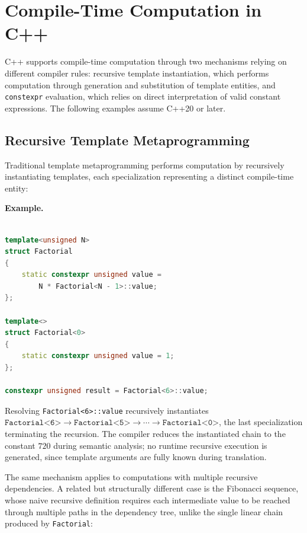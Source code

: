 \documentclass[11pt]{report}
\begin{document}

\section{Compile-Time Computation in C++}
\label{Metaprogramming:Compile-TimeComputationCpp}

C++ supports compile-time computation through two mechanisms relying on
different compiler rules: recursive template instantiation, which performs
computation through generation and substitution of template entities, and
\texttt{constexpr} evaluation, which relies on direct interpretation of
valid constant expressions. The following examples assume C++20 or later.

\subsection{Recursive Template Metaprogramming}
\label{Metaprogramming:Compile-TimeComputationCpp:RecursiveTemplateMetaprogrammingExample}
Traditional template metaprogramming performs computation by recursively
instantiating templates, each specialization representing a distinct
compile-time entity:

\begin{examplebox}
\textbf{Example.}

\begin{lstlisting}[language=C++]

template<unsigned N>
struct Factorial
{
    static constexpr unsigned value =
        N * Factorial<N - 1>::value;
};

template<>
struct Factorial<0>
{
    static constexpr unsigned value = 1;
};

constexpr unsigned result = Factorial<6>::value;
\end{lstlisting}
Resolving \texttt{Factorial<6>::value} recursively instantiates
$\texttt{Factorial<6>} \rightarrow \texttt{Factorial<5>} \rightarrow \cdots
\rightarrow \texttt{Factorial<0>}$, the last specialization terminating the
recursion. The compiler reduces the instantiated chain to the constant
$720$ during semantic analysis; no runtime recursive execution is
generated, since template arguments are fully known during translation.
\end{examplebox}


The same mechanism applies to computations with multiple recursive
dependencies. A related but structurally different case is the Fibonacci
sequence, whose naive recursive definition requires each intermediate
value to be reached through multiple paths in the dependency tree, unlike
the single linear chain produced by \texttt{Factorial}:
\end{document}
